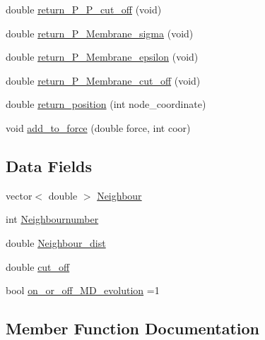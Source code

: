 \begin{DoxyCompactItemize}
double \mbox{\hyperlink{classpoint__particle_a02ada7bba125dc701f5c8a4d067dc8c0}{return\+\_\+\+P\+\_\+\+P\+\_\+cut\+\_\+off}} (void)
\item 
double \mbox{\hyperlink{classpoint__particle_a51f76ba04a942622d54fb4e5388518a6}{return\+\_\+\+P\+\_\+\+Membrane\+\_\+sigma}} (void)
\item 
double \mbox{\hyperlink{classpoint__particle_ac2e3983a015b533b30209283a3692cc1}{return\+\_\+\+P\+\_\+\+Membrane\+\_\+epsilon}} (void)
\item 
double \mbox{\hyperlink{classpoint__particle_ae2d18d929b1558333ecd86b17f7caa6d}{return\+\_\+\+P\+\_\+\+Membrane\+\_\+cut\+\_\+off}} (void)
\item 
double \mbox{\hyperlink{classpoint__particle_a3785ab52126a3b9f4f9a38bd35378771}{return\+\_\+position}} (int node\+\_\+coordinate)
\item 
void \mbox{\hyperlink{classpoint__particle_aee14a82e8900194e3858fe19822725cd}{add\+\_\+to\+\_\+force}} (double force, int coor)
\end{DoxyCompactItemize}
\subsection*{Data Fields}
\begin{DoxyCompactItemize}
\item 
vector$<$ double $>$ \mbox{\hyperlink{classpoint__particle_a00cb25fd2627593ac107a232efbdb65d}{Neighbour}}
\item 
int \mbox{\hyperlink{classpoint__particle_a434dc5e0503b9c29546dd906b57288fd}{Neighbournumber}}
\item 
double \mbox{\hyperlink{classpoint__particle_a0d5ac2e186afd64b4d50ec2835fe9706}{Neighbour\+\_\+dist}}
\item 
double \mbox{\hyperlink{classpoint__particle_ab6a87fce5a3b85ca0b2037066fa31e63}{cut\+\_\+off}}
\item 
bool \mbox{\hyperlink{classpoint__particle_afee389a618e3c3c64e255329b1985ae3}{on\+\_\+or\+\_\+off\+\_\+\+M\+D\+\_\+evolution}} =1
\end{DoxyCompactItemize}


\subsection{Member Function Documentation}
\mbox{\label{classpoint__particle_aee14a82e8900194e3858fe19822725cd}} 
